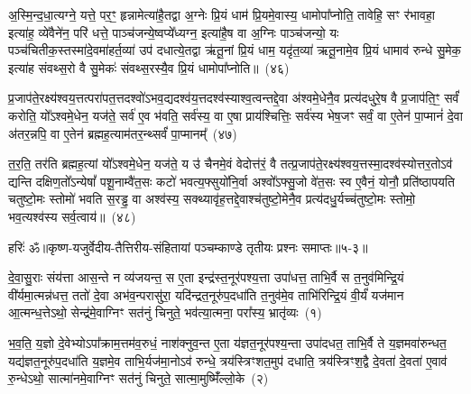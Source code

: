 अ॒स्मि॒न्द॒धा॒त्यग्ने॒ यत्ते॒ पर॒ꣳ॒ हृन्नामेत्या॑है॒तद्वा अ॒ग्नेः प्रि॒यं धाम॑ प्रि॒यमे॒वास्य॒ धामोपा᳚प्नोति॒ तावेहि॒ सꣳ र॑भावहा॒ इत्या॑ह॒ व्ये॑वैने॑न॒ परि॑ धत्ते॒ पाञ्च॑जन्ये॒ष्वप्ये᳚ध्यग्न॒ इत्या॑है॒ष वा अ॒ग्निः पाञ्च॑जन्यो॒ यः पञ्च॑चितीक॒स्तस्मा॑दे॒वमा॑हर्त॒व्या॑ उप॑ दधात्ये॒तद्वा ऋ॑तू॒नां प्रि॒यं धाम॒ यदृ॑त॒व्या॑ ऋतू॒नामे॒व प्रि॒यं धामाव॑ रुन्धे सु॒मेक॒ इत्या॑ह संवथ्स॒रो वै सु॒मेकः॑ संवथ्स॒रस्यै॒व प्रि॒यं धामोपा᳚प्नोति॥~(४६)

{\anuvakamend[{अभ॑व॒न्नायु॑रे॒वर्त॒व्या॑ उप॒ षड्विꣳ॑शतिश्च}]}%

प्र॒जा\-प॑ते॒रक्ष्य॑श्वय॒त्तत्परा॑पत॒त्तदश्वो॑\-ऽभव॒द्यदश्व॑य॒त्तदश्व॑स्याश्व॒त्वन्तद्दे॒वा अ॑श्वमे॒धेनै॒व प्रत्य॑दधुरे॒ष वै प्र॒जा\-प॑ति॒ꣳ॒ सर्वं॑ करोति॒ यो᳚\-ऽश्वमे॒धेन॒ यज॑ते॒ सर्व॑ ए॒व भ॑वति॒ सर्व॑स्य॒ वा ए॒षा प्राय॑श्चित्तिः॒ सर्व॑स्य भेष॒जꣳ सर्वं॒ वा ए॒तेन॑ पा॒प्मानं॑ दे॒वा अ॑तर॒न्नपि॒ वा ए॒तेन॑ ब्रह्मह॒त्याम॑तर॒न्थ्सर्वं॑ पा॒प्मानम्᳚~(४७)

त॒र॒ति॒ तर॑ति ब्रह्मह॒त्यां यो᳚\-ऽश्वमे॒धेन॒ यज॑ते॒ य उ॑ चैनमे॒वं वेदोत्त॑रं॒ वै तत्प्र॒जा\-प॑ते॒रक्ष्य॑श्वय॒त्तस्मा॒दश्व॑स्योत्तर॒तो\-ऽव॑ द्यन्ति दक्षिण॒तो᳚\-ऽन्येषां᳚ पशू॒नाम्वै॑त॒सः कटो॑ भवत्य॒फ्सुयो॑नि॒र्वा अश्वो᳚\-ऽफ्सु॒जो वे॑त॒सः स्व ए॒वैनं॒ योनौ॒ प्रति॑\-ष्ठापयति चतुष्टो॒मः स्तोमो॑ भवति स॒रड्ढ॒ वा अश्व॑स्य॒ सक्थ्यावृ॑ह॒त्तद्दे॒वाश्च॑तुष्टो॒मेनै॒व प्रत्य॑दधु॒र्यच्च॑तुष्टो॒मः स्तोमो॒ भव॒त्यश्व॑स्य सर्व॒त्वाय॑॥~(४८)

{\anuvakamend[{सर्वं॑ पा॒प्मान॑मवृह॒द्द्वाद॑श च}]}%

{हरिः॑ ॐ}{॥कृष्ण-यजुर्वेदीय-तैत्तिरीय-संहितायां पञ्चम्काण्डे तृतीयः प्रश्नः समाप्तः॥५-३॥}

\setcounter{anuvakam}{0}
दे॒वा॒सु॒राः संय॑त्ता आस॒न्ते न व्य॑जयन्त॒ स ए॒ता इन्द्र॑स्त॒नूर॑पश्य॒त्ता उपा॑धत्त॒ ताभि॒र्वै स त॒नुव॑मिन्द्रि॒यं वी॑र्यमा॒त्मन्न॑धत्त॒ ततो॑ दे॒वा अभ॑व॒न्परासु॑रा॒ यदि॑न्द्रत॒नूरु॑प॒दधा॑ति त॒नुव॑मे॒व ताभि॑रिन्द्रि॒यं वी॒र्यं॑ यज॑मान आ॒त्मन्ध॒त्ते\-ऽथो॒ सेन्द्र॑मे॒वाग्निꣳ सत॑नुं चिनुते॒ भव॑त्या॒त्मना॒ परा᳚स्य॒ भ्रातृ॑व्यः~(१)

भ॒व॒ति॒ य॒ज्ञो दे॒वेभ्यो\-ऽपा᳚क्राम॒त्तम॑व॒रुधं॒ नाश॑क्नुव॒न्त ए॒ता य॑ज्ञत॒नूर॑पश्य॒न्ता उपा॑दधत॒ ताभि॒र्वै ते य॒ज्ञमवा॑रुन्धत॒ यद्य॑ज्ञत॒नूरु॑प॒दधा॑ति य॒ज्ञमे॒व ताभि॒र्यज॑मा॒नो\-ऽव॑ रुन्धे॒ त्रय॑स्त्रिꣳशत॒मुप॑ दधाति॒ त्रय॑स्त्रिꣳश॒द्वै दे॒वता॑ दे॒वता॑ ए॒वाव॑ रु॒न्धे\-ऽथो॒ सात्मा॑नमे॒वाग्निꣳ सत॑नुं चिनुते॒ सात्मा॒मुष्मिँ॑ल्लो॒के~(२)

